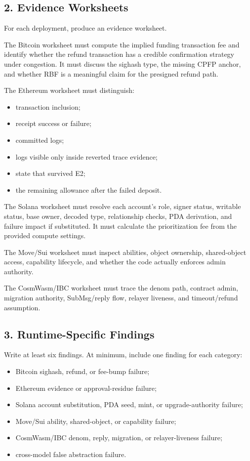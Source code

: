 \subsection*{2. Evidence Worksheets}

For each deployment, produce an evidence worksheet.

The Bitcoin worksheet must compute the implied funding transaction fee and identify whether the refund transaction has a credible confirmation strategy under congestion. It must discuss the sighash type, the missing CPFP anchor, and whether RBF is a meaningful claim for the presigned refund path.

The Ethereum worksheet must distinguish:

\begin{itemize}
\item transaction inclusion;
\item receipt success or failure;
\item committed logs;
\item logs visible only inside reverted trace evidence;
\item state that survived E2;
\item the remaining allowance after the failed deposit.
\end{itemize}

The Solana worksheet must resolve each account's role, signer status, writable status, base owner, decoded type, relationship checks, PDA derivation, and failure impact if substituted. It must calculate the prioritization fee from the provided compute settings.

The Move/Sui worksheet must inspect abilities, object ownership, shared-object access, capability lifecycle, and whether the code actually enforces admin authority.

The CosmWasm/IBC worksheet must trace the denom path, contract admin, migration authority, SubMsg/reply flow, relayer liveness, and timeout/refund assumption.

\subsection*{3. Runtime-Specific Findings}

Write at least six findings. At minimum, include one finding for each category:

\begin{itemize}
\item Bitcoin sighash, refund, or fee-bump failure;
\item Ethereum evidence or approval-residue failure;
\item Solana account substitution, PDA seed, mint, or upgrade-authority failure;
\item Move/Sui ability, shared-object, or capability failure;
\item CosmWasm/IBC denom, reply, migration, or relayer-liveness failure;
\item cross-model false abstraction failure.
\end{itemize}

